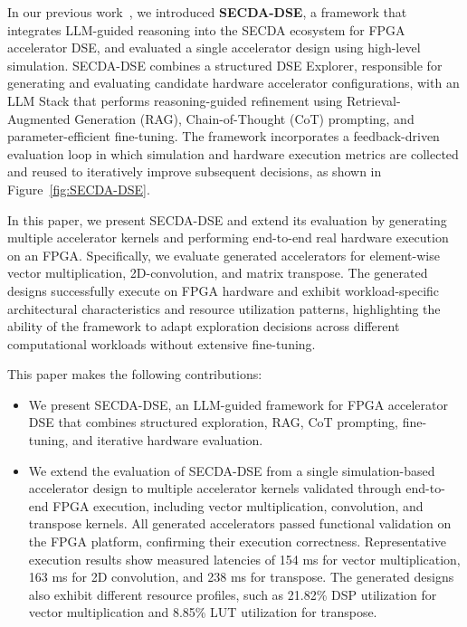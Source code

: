 In our previous work~\cite{sharma2026llm}, we introduced \textbf{SECDA-DSE}, a framework that integrates LLM-guided reasoning into the SECDA ecosystem for FPGA accelerator DSE, and evaluated a single accelerator design using high-level simulation. 
SECDA-DSE combines a structured DSE Explorer, responsible for generating and evaluating candidate hardware accelerator configurations, with an LLM Stack that performs reasoning-guided refinement using Retrieval-Augmented Generation (RAG), Chain-of-Thought (CoT) prompting, and parameter-efficient fine-tuning. The framework incorporates a feedback-driven evaluation loop in which simulation and hardware execution metrics are collected and reused to iteratively improve subsequent decisions, as shown in Figure~\ref{fig:SECDA-DSE}.


In this paper, we present SECDA-DSE and extend its evaluation by generating multiple accelerator kernels and performing end-to-end real hardware execution on an FPGA. 
Specifically, we evaluate generated accelerators for element-wise vector multiplication, 2D-convolution, and matrix transpose. The generated designs successfully execute on FPGA hardware and exhibit workload-specific architectural characteristics and resource utilization patterns, highlighting the ability of the framework to adapt exploration decisions across different computational workloads without extensive fine-tuning.

This paper makes the following contributions:

\begin{itemize}
    \item We present SECDA-DSE, an LLM-guided framework for FPGA accelerator DSE that combines structured exploration, RAG, CoT prompting, fine-tuning, and iterative hardware evaluation.

    \item We extend the evaluation of SECDA-DSE from a single simulation-based accelerator design to multiple accelerator kernels validated through end-to-end FPGA execution, including vector multiplication, convolution, and transpose kernels. All generated accelerators passed functional validation on the FPGA platform, confirming their execution correctness. Representative execution results show measured latencies of 154 ms for vector multiplication, 163 ms for 2D convolution, and 238 ms for transpose. The generated designs also exhibit different resource profiles, such as 21.82\% DSP utilization for vector multiplication and 8.85\% LUT utilization for transpose.

\end{itemize}